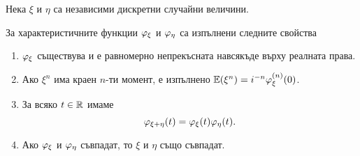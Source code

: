 \documentclass[numbers=endperiod, DIV=15, bibliography=totocnumbered]{scrartcl}
\begin{document}
\begin{theorem}\label{thm:char-props}
  Нека $\xi$ и $\eta$ са независими дискретни случайни величини.

  За характеристичните функции $\varphi_\xi$ и $\varphi_\eta$ са изпълнени следните свойства
  \begin{enumerate}
    \item $\varphi_\xi$ съществува и е равномерно непрекъсната навсякъде върху реалната права.

    \item Ако $\xi^n$ има краен $n$-ти момент, е изпълнено $\mathbb{E}(\xi^n) = i^{-n} \varphi_\xi^{(n)} (0)$.

    \item За всяко $t \in \mathbb{R}$ имаме
    \begin{displaymath}
      \varphi_{\xi + \eta}(t) = \varphi_\xi(t) \varphi_\eta(t).
    \end{displaymath}

    \item Ако $\varphi_\xi$ и $\varphi_\eta$ съвпадат, то $\xi$ и $\eta$ също съвпадат.
  \end{enumerate}
\end{theorem}
\end{document}
